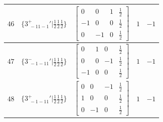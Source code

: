 \documentclass[fleqn,8pt]{jsarticle}
\begin{document}
\begin{longtable}{ccccc}
$ 46 $ & $ \{3^{+}_{\,\,-11-1}{}'|\frac{1}{2} \frac{1}{2} \frac{1}{2}\} $ & $ \begin{bmatrix} 0 & 0 & 1 & \frac{1}{2} \\ -1 & 0 & 0 & \frac{1}{2} \\ 0 & -1 & 0 & \frac{1}{2} \end{bmatrix} $ & $ 1 $ & $ -1 $ \\ \hline
$ 47 $ & $ \{3^{-}_{\,\,-1-11}{}'|\frac{1}{2} \frac{1}{2} \frac{1}{2}\} $ & $ \begin{bmatrix} 0 & 1 & 0 & \frac{1}{2} \\ 0 & 0 & -1 & \frac{1}{2} \\ -1 & 0 & 0 & \frac{1}{2} \end{bmatrix} $ & $ 1 $ & $ -1 $ \\ \hline
$ 48 $ & $ \{3^{+}_{\,\,-1-11}{}'|\frac{1}{2} \frac{1}{2} \frac{1}{2}\} $ & $ \begin{bmatrix} 0 & 0 & -1 & \frac{1}{2} \\ 1 & 0 & 0 & \frac{1}{2} \\ 0 & -1 & 0 & \frac{1}{2} \end{bmatrix} $ & $ 1 $ & $ -1 $ \\
\end{longtable}
\end{document}
